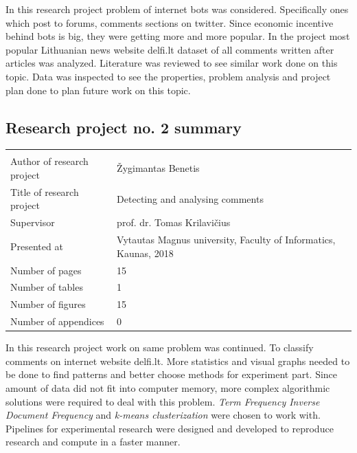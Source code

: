 \documentclass[a4paper,12pt]{article}
\begin{document}
	\vspace{5mm}
	
	In this research project problem of internet bots was considered. Specifically ones which post to forums, comments sections on twitter. Since economic incentive behind bots is big, they were getting more and more popular. In the project most popular Lithuanian news website delfi.lt dataset of all comments written after articles was analyzed. Literature was reviewed to see similar work done on this topic. Data was inspected to see the properties, problem analysis and project plan done to plan future work on this topic. 
	
	\clearpage
	
	\subsection{Research project no. 2 summary}
	
	
	\noindent
	\begin{center}
		\begin{tabular}{L{4.5cm} L{8cm}}
			\\ 
			Author of research project & Žygimantas Benetis \\
			Title of research project & Detecting and analysing comments\\
			Supervisor & prof. dr. Tomas Krilavičius\\
			Presented at & Vytautas Magnus university, Faculty of Informatics, Kaunas, 2018\\
			Number of pages & 15\\
			Number of tables & 1\\
			Number of figures & 15\\
			Number of appendices & 0\\
		\end{tabular}
	\end{center} 

	\vspace{5mm}
	
	In this research project work on same problem was continued. To classify comments on internet website delfi.lt. More statistics  and visual graphs needed to be done to find patterns and better choose methods for experiment part. Since amount of data did not fit into computer memory, more complex algorithmic solutions were required to deal with this problem. \textit{Term Frequency Inverse Document Frequency} and \textit{k-means clusterization} were chosen to work with. Pipelines for experimental research were designed and developed to reproduce research and compute in a faster manner.
	
\end{document}
